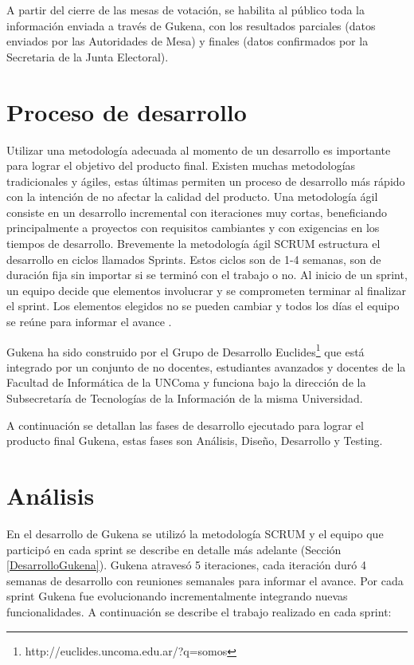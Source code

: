 A partir del cierre de las mesas de votación, se habilita al público toda la información enviada a través de Gukena, con los resultados parciales (datos enviados por las Autoridades de Mesa) y finales (datos confirmados por la Secretaria de la Junta Electoral).

\section{Proceso de desarrollo}
Utilizar una metodología adecuada al momento de un desarrollo es importante para lograr el objetivo del producto final. Existen muchas metodologías tradicionales y ágiles, estas últimas permiten un proceso de desarrollo más rápido con la intención de no afectar la calidad del producto. Una metodología ágil consiste en un desarrollo incremental con iteraciones muy cortas, beneficiando principalmente a proyectos con requisitos cambiantes y con exigencias en los tiempos
de desarrollo. Brevemente la metodología ágil SCRUM estructura el desarrollo en ciclos llamados Sprints. Estos ciclos son de 1-4 semanas, son de duración fija sin importar si se terminó con el trabajo o no. Al inicio de un sprint, un equipo decide que elementos involucrar y se comprometen terminar al finalizar el sprint. Los elementos elegidos no se pueden cambiar y todos los días el equipo se reúne para informar el avance \cite{scrum}.

Gukena ha sido construido por el Grupo de Desarrollo Euclides\footnote{http://euclides.uncoma.edu.ar/?q=somos} que está integrado por un conjunto de no docentes, estudiantes avanzados y docentes de la Facultad de Informática de la UNComa y funciona bajo la dirección de la Subsecretaría de Tecnologías de la Información de la misma Universidad.

A continuación se detallan las fases de desarrollo ejecutado para lograr el producto final Gukena, estas fases son Análisis, Diseño, Desarrollo y Testing.

\section{Análisis}

En el desarrollo de Gukena se utilizó la metodología SCRUM y el equipo que participó en cada sprint se describe en detalle más adelante (Sección \ref{DesarrolloGukena}). Gukena atravesó 5 iteraciones, cada iteración duró 4 semanas de desarrollo con reuniones semanales para informar el avance. 
Por cada sprint Gukena fue evolucionando incrementalmente integrando nuevas funcionalidades. A continuación se describe el trabajo realizado en cada sprint:

